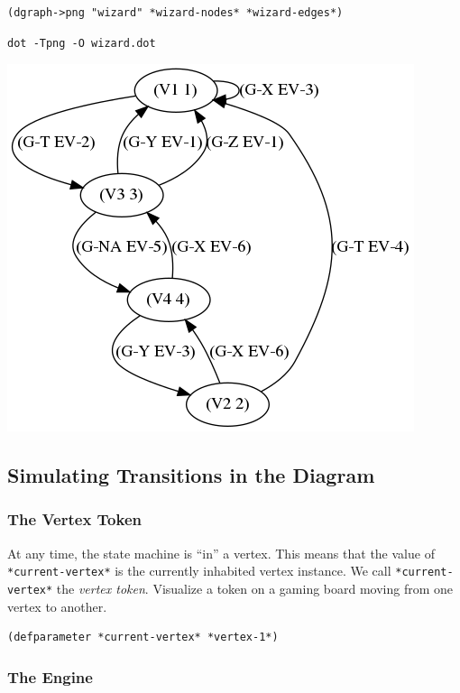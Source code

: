\documentclass[10pt,oneside,x11names]{article}
\begin{document}
\begin{verbatim}
(dgraph->png "wizard" *wizard-nodes* *wizard-edges*)
\end{verbatim}

\begin{verbatim}
dot -Tpng -O wizard.dot
\end{verbatim}
\begin{center}
\includegraphics[width=.9\linewidth]{wizard.dot.png}
\end{center}

\subsection{Simulating Transitions in the Diagram}
\label{sec:org7455244}

\subsubsection{The Vertex Token}
\label{sec:org619d162}

At any time, the state machine is ``in'' a vertex. This means that the value
of \texttt{*current-vertex*} is the currently inhabited vertex instance. We call
\texttt{*current-vertex*} the \emph{vertex token}. Visualize a token on a gaming board
moving from one vertex to another.

\begin{verbatim}
(defparameter *current-vertex* *vertex-1*)
\end{verbatim}

\subsubsection{The Engine}
\label{sec:org572be1f}
\end{document}
